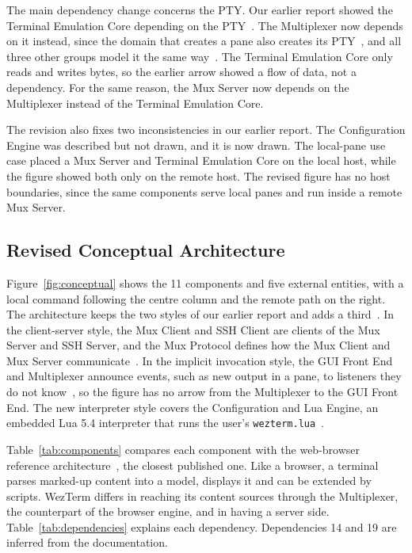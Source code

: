The main dependency change concerns the PTY. Our earlier report showed the Terminal Emulation Core depending on the PTY~\cite{a1-report}. The Multiplexer now depends on it instead, since the domain that creates a pane also creates its PTY~\cite{what-is-a-terminal,multiplexing}, and all three other groups model it the same way~\cite{g7-a1,g13-a1,g22-a1}. The Terminal Emulation Core only reads and writes bytes, so the earlier arrow showed a flow of data, not a dependency. For the same reason, the Mux Server now depends on the Multiplexer instead of the Terminal Emulation Core.

The revision also fixes two inconsistencies in our earlier report. The Configuration Engine was described but not drawn, and it is now drawn. The local-pane use case placed a Mux Server and Terminal Emulation Core on the local host, while the figure showed both only on the remote host. The revised figure has no host boundaries, since the same components serve local panes and run inside a remote Mux Server.

\subsection{Revised Conceptual Architecture}
\label{sec:revised-conceptual}

Figure~\ref{fig:conceptual} shows the 11 components and five external entities, with a local command following the centre column and the remote path on the right. The architecture keeps the two styles of our earlier report and adds a third~\cite{arch-styles}. In the client-server style, the Mux Client and SSH Client are clients of the Mux Server and SSH Server, and the Mux Protocol defines how the Mux Client and Mux Server communicate~\cite{multiplexing}. In the implicit invocation style, the GUI Front End and Multiplexer announce events, such as new output in a pane, to listeners they do not know~\cite{event-registration}, so the figure has no arrow from the Multiplexer to the GUI Front End. The new interpreter style covers the Configuration and Lua Engine, an embedded Lua 5.4 interpreter that runs the user's \texttt{wezterm.lua}~\cite{lua-reference}.

Table~\ref{tab:components} compares each component with the web-browser reference architecture~\cite{refarch-browser}, the closest published one. Like a browser, a terminal parses marked-up content into a model, displays it and can be extended by scripts. WezTerm differs in reaching its content sources through the Multiplexer, the counterpart of the browser engine, and in having a server side. Table~\ref{tab:dependencies} explains each dependency. Dependencies 14 and 19 are inferred from the documentation.

